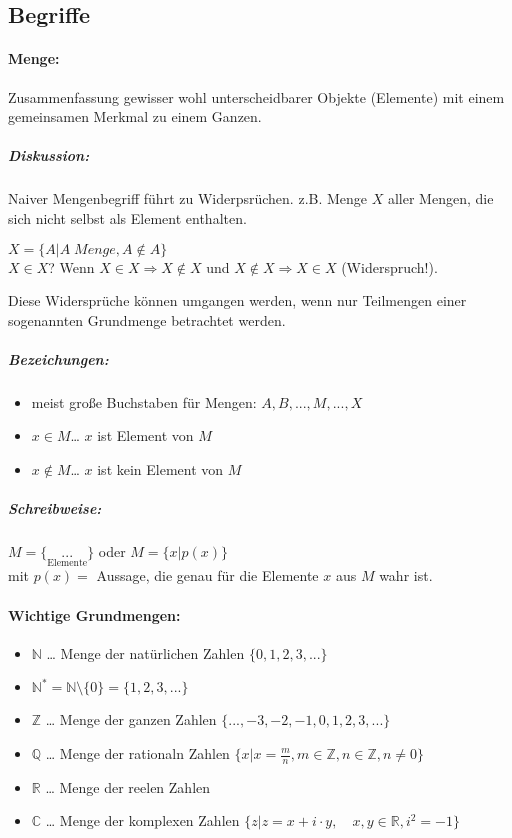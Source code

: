 \subsection{Begriffe}

\paragraph{Menge:} Zusammenfassung gewisser wohl unterscheidbarer Objekte (Elemente) mit einem gemeinsamen Merkmal zu einem Ganzen.

\subparagraph{Diskussion:} Naiver Mengenbegriff führt zu Widerpsrüchen. z.B. Menge $X$ aller Mengen, die sich nicht selbst als Element enthalten.

$X=\{A | A \; Menge, A\not\in A\}$\\
$X\in X$? Wenn $X\in X \Rightarrow X\not\in X$ und $X\not\in X\Rightarrow X \in X$ (Widerspruch!).

Diese Widersprüche können umgangen werden, wenn nur Teilmengen einer sogenannten Grundmenge betrachtet werden.

\subparagraph{Bezeichungen:}
\begin{itemize}
\item meist große Buchstaben für Mengen: $A, B, ..., M, ...,X$
\item $\boxed{x\in M}$… $x$ ist Element von $M$
\item $\boxed{x\not\in M}$… $x$ ist kein Element von $M$
\end{itemize}

\subparagraph{Schreibweise:} \parskp
$M=\{\underset{\text{Elemente}}{...}\}$ oder $M = \{ x | p(x)\}$\\
mit $p(x)=$ Aussage, die genau für die Elemente $x$ aus $M$ wahr ist.

\paragraph{Wichtige Grundmengen:}
\begin{itemize}
\item $\mathbb{N}$ … Menge der natürlichen Zahlen $\{0,1,2,3,...\}$
\item $\mathbb{N}^*=\mathbb{N}\setminus \{0\} = \{1,2,3,...\}$
\item $\mathbb{Z}$ … Menge der ganzen Zahlen $\{...,-3,-2,-1,0,1,2,3,...\}$
\item $\mathbb{Q}$ … Menge der rationaln Zahlen $\{ x | x = \frac{m}{n}, m\in \mathbb{Z}, n \in \mathbb{Z}, n\not= 0\}$
\item $\mathbb{R}$ … Menge der reelen Zahlen
\item $\mathbb{C}$ … Menge der komplexen Zahlen $\{ z | z=x+ i \cdot  y,\quad x, y \in \mathbb{R}, i^2=-1\}$
\end{itemize}

